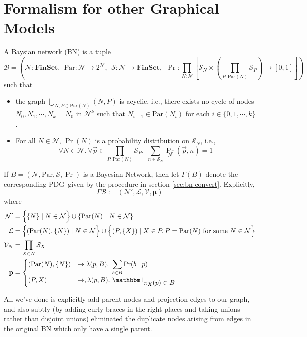 \documentclass{article}
\newcommand\bmu{\boldsymbol{\mu}}
\newcommand{\MN}{PDG}
\begin{document}
	\section{Formalism for other Graphical Models}
	\begin{defn}
		A Baysian network (BN) is a tuple
		\[
		\mathcal B = \left(\mathcal N : \mathbf{FinSet}, ~~\mathrm{Par}: \mathcal N \to 2^{\mathcal N},~~ \mathcal S: \mathcal N \to \mathbf{FinSet},~~\Pr: \prod_{N : \mathcal N}  \left[ \mathcal S_N \times \left(\prod_{P : \mathrm{Par}(N)} \mathcal S_P\right)  \to [0,1] \right] \right)
		\]
		such that
		\begin{itemize}[nosep]
			\item the graph $\bigcup_{N, P \in \mathrm{Par}(N)}(N, P)$ is acyclic, i.e., there exists no cycle of nodes $N_0, N_1, \cdots, N_k = N_0$ in $\mathcal N^k$ such that $N_{i+1} \in \mathrm{Par}(N_i)$ for each $i \in \{0, 1, \cdots, k\}$.
			\item For all $N \in \mathcal N$, $\Pr(N)$ is a probability distribution on $\mathcal S_N$, i.e., 
			\[ \forall N\in \mathcal N.~\forall \vec{p} \in {\prod_{P : \mathrm{Par}(N)} \mathcal S_P}.~~ \sum_{n \in \mathcal S_{N}} \Pr_N(\vec{p}, n) = 1\]
		\end{itemize}
	\end{defn}
	
	
	\begin{defn}
		If $B = (\mathcal N, \mathrm{Par}, \mathcal S, \Pr)$ is a Bayesian Network, then let $\Gamma (B)$ denote the corresponding \MN\ given by the procedure in section \ref{sec:bn-convert}. Explicitly, 
		\[ \Gamma\mathcal B :=  (\mathcal N', \mathcal L, \mathcal V, \bmu) \]
		where %
		\begin{align*}
		\mathcal N' &=  \left\{ \Big.\{N\} \mid N \in \mathcal N\right\} \cup \left\{ \mathrm{Par}(N) ~\middle|~ N \in \cal N \right\} \\%
		\mathcal L &= \left\{ \vphantom{\Big|}(\mathrm{Par}(N), \{N\}) \mid N \in \mathcal N \right\} \cup 
		\left\{\vphantom{\Big|} (P, \{X\}) \mid X \in P, P = \mathrm{Par}(N) \text{ for some }N \in \mathcal N \right\} \\
		\mathcal V_N &= \prod_{X \in N} \mathcal S_X \\
		\mathbf p &= \begin{cases}
		(\mathrm{Par}(N), \{N\}) &\mapsto \lambda(p, B).~ \displaystyle\sum_{b \in  B} \Pr(b \mid p) \\
		(P, X) &\mapsto, \lambda (p, B).~ \displaystyle \mathbbm 1_{\displaystyle\pi_X(p) \in B}
		\end{cases}
		\end{align*}
	\end{defn}
	All we've done is explicitly add parent nodes and projection edges to our graph, and also subtly (by adding curly braces in the right places and taking unions rather than disjoint unions) eliminated the duplicate nodes arising from edges in the original BN which only have a single parent.
	
\end{document}
